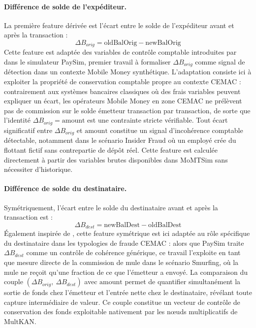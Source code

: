 \documentclass[11pt,a4paper,oneside]{report}
\theoremstyle{definition}
\theoremstyle{remark}
\begin{document}
\paragraph{Différence de solde de l'expéditeur.}
La première feature dérivée est l'écart entre le solde de l'expéditeur avant et après la transaction :
\begin{equation}
    \Delta B_{orig} = \text{oldBalOrig} - \text{newBalOrig}
\end{equation}
Cette feature est adaptée des variables de contrôle comptable introduites par \citet{lopezrojas2016paysim} dans le simulateur PaySim, premier travail à formaliser $\Delta B_{orig}$ comme signal de détection dans un contexte Mobile Money synthétique. L'adaptation consiste ici à exploiter la propriété de conservation comptable propre au contexte CEMAC : contrairement aux systèmes bancaires classiques où des frais variables peuvent expliquer un écart, les opérateurs Mobile Money en zone CEMAC ne prélèvent pas de commission sur le solde émetteur transaction par transaction, de sorte que l'identité $\Delta B_{orig} = \text{amount}$ est une contrainte stricte vérifiable. Tout écart significatif entre $\Delta B_{orig}$ et $\text{amount}$ constitue un signal d'incohérence comptable détectable, notamment dans le scénario Insider Fraud où un employé crée du flottant fictif sans contrepartie de dépôt réel. Cette feature est calculée directement à partir des variables brutes disponibles dans MoMTSim sans nécessiter d'historique.

\paragraph{Différence de solde du destinataire.}
Symétriquement, l'écart entre le solde du destinataire avant et après la transaction est :
\begin{equation}
    \Delta B_{dest} = \text{newBalDest} - \text{oldBalDest}
\end{equation}
Également inspirée de \citet{lopezrojas2016paysim}, cette feature symétrique est ici adaptée au rôle spécifique du destinataire dans les typologies de fraude CEMAC : alors que PaySim traite $\Delta B_{dest}$ comme un contrôle de cohérence générique, ce travail l'exploite en tant que mesure directe de la commission de mule dans le scénario Smurfing, où la mule ne reçoit qu'une fraction de ce que l'émetteur a envoyé. La comparaison du couple $(\Delta B_{orig},\ \Delta B_{dest})$ avec $\text{amount}$ permet de quantifier simultanément la sortie de fonds chez l'émetteur et l'entrée nette chez le destinataire, révélant toute capture intermédiaire de valeur. Ce couple constitue un vecteur de contrôle de conservation des fonds exploitable nativement par les nœuds multiplicatifs de MultKAN.
\end{document}
